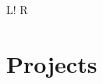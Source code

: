 \documentclass[10pt, a4paper]{article}
\newcommand\vsep{\color{lightgray} \vrule width 0.5pt}
\newcommand\sect[1]{\section*{\hspace{.05cm} \Large\sc #1}}
\newcommand\itemizespace{\vspace{-0.65\baselineskip}}
\newcommand\finishsectionspace{\vspace{-1.1\baselineskip}}
\newcommand\tspace{\hfill}
\begin{document}
\begin{tabular}{L!{\vsep}R}
            \end{tabular}
        \sect{Projects}
\end{document}
